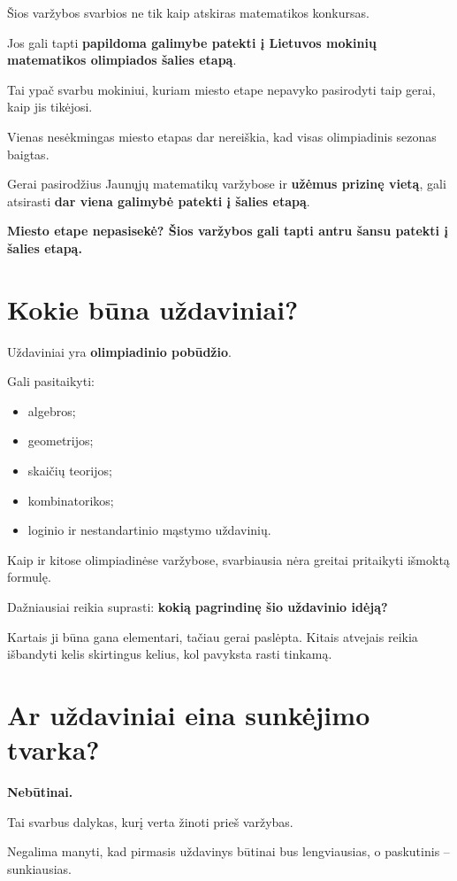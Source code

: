 \documentclass[11pt,a4paper]{article}
\newcommand{\calloutbox}[1]{%
  \begin{center}
  \colorbox{callout}{%
    \parbox{0.94\textwidth}{\centering\bfseries #1}%
  }
  \end{center}
}
\begin{document}
Šios varžybos svarbios ne tik kaip atskiras matematikos konkursas.

Jos gali tapti \textbf{papildoma galimybe patekti į Lietuvos mokinių matematikos olimpiados šalies etapą}.

Tai ypač svarbu mokiniui, kuriam miesto etape nepavyko pasirodyti taip gerai, kaip jis tikėjosi.

Vienas nesėkmingas miesto etapas dar nereiškia, kad visas olimpiadinis sezonas baigtas.

Gerai pasirodžius Jaunųjų matematikų varžybose ir \textbf{užėmus prizinę vietą}, gali atsirasti \textbf{dar viena galimybė patekti į šalies etapą}.

\calloutbox{Miesto etape nepasisekė? Šios varžybos gali tapti antru šansu patekti į šalies etapą.}

\section{Kokie būna uždaviniai?}

Uždaviniai yra \textbf{olimpiadinio pobūdžio}.

Gali pasitaikyti:
\begin{itemize}
  \item algebros;
  \item geometrijos;
  \item skaičių teorijos;
  \item kombinatorikos;
  \item loginio ir nestandartinio mąstymo uždavinių.
\end{itemize}

Kaip ir kitose olimpiadinėse varžybose, svarbiausia nėra greitai pritaikyti išmoktą formulę.

\newpage

Dažniausiai reikia suprasti: \textbf{kokią pagrindinę šio uždavinio idėją?}

Kartais ji būna gana elementari, tačiau gerai paslėpta. Kitais atvejais reikia išbandyti kelis skirtingus kelius, kol pavyksta rasti tinkamą.

\section{Ar uždaviniai eina sunkėjimo tvarka?}

\textbf{Nebūtinai.}

Tai svarbus dalykas, kurį verta žinoti prieš varžybas.

Negalima manyti, kad pirmasis uždavinys būtinai bus lengviausias, o paskutinis -- sunkiausias.
\end{document}
